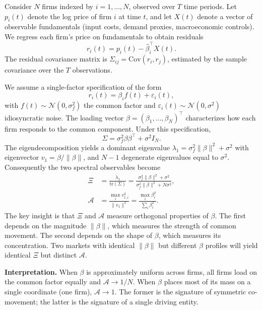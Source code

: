 \documentclass[12pt,a4paper]{article}
\newcommand{\SEA}{\mathcal{A}}
\begin{document}
Consider $N$ firms indexed by $i = 1, \dots, N$, observed over $T$ time periods. Let $p_i(t)$ denote the log price of firm $i$ at time $t$, and let $X(t)$ denote a vector of observable fundamentals (input costs, demand proxies, macroeconomic controls). We regress each firm's price on fundamentals to obtain residuals
\begin{equation}
  r_i(t) = p_i(t) - \hat{\beta}_i^\top X(t).
\end{equation}
The residual covariance matrix is $\Sigma_{ij} = \mathrm{Cov}(r_i, r_j)$, estimated by the sample covariance over the $T$ observations.

We assume a single-factor specification of the form
\begin{equation}
  r_i(t) = \beta_i f(t) + \varepsilon_i(t),
\end{equation}
with $f(t) \sim \mathcal{N}(0, \sigma_f^2)$ the common factor and $\varepsilon_i(t) \sim \mathcal{N}(0, \sigma^2)$ idiosyncratic noise. The loading vector $\beta = (\beta_1, \dots, \beta_N)^\top$ characterizes how each firm responds to the common component. Under this specification,
\begin{equation}
  \Sigma = \sigma_f^2 \beta \beta^\top + \sigma^2 I_N.
\end{equation}
The eigendecomposition yields a dominant eigenvalue $\lambda_1 = \sigma_f^2 \|\beta\|^2 + \sigma^2$ with eigenvector $v_1 = \beta / \|\beta\|$, and $N-1$ degenerate eigenvalues equal to $\sigma^2$. Consequently the two spectral observables become
\begin{align}
  \Xi &= \frac{\lambda_1}{\mathrm{tr}(\Sigma)} = \frac{\sigma_f^2 \|\beta\|^2 + \sigma^2}{\sigma_f^2 \|\beta\|^2 + N\sigma^2}, \\[4pt]
  \SEA &= \frac{\max_i v_{1,i}^2}{\|v_1\|^2} = \frac{\max_i \beta_i^2}{\sum_i \beta_i^2}.
\end{align}
The key insight is that $\Xi$ and $\SEA$ measure orthogonal properties of $\beta$. The first depends on the magnitude $\|\beta\|$, which measures the strength of common movement. The second depends on the shape of $\beta$, which measures its concentration. Two markets with identical $\|\beta\|$ but different $\beta$ profiles will yield identical $\Xi$ but distinct $\SEA$.

\textbf{Interpretation.} When $\beta$ is approximately uniform across firms, all firms load on the common factor equally and $\SEA \to 1/N$. When $\beta$ places most of its mass on a single coordinate (one firm), $\SEA \to 1$. The former is the signature of symmetric co-movement; the latter is the signature of a single driving entity.
\end{document}
